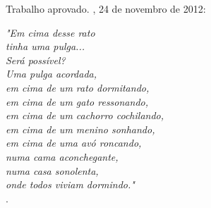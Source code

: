 
	\begin{folhadeaprovacao}

		\begin{center}
		  {\ABNTEXchapterfont\large\imprimirautor}
		  \vspace*{\fill}\vspace*{\fill}
		  \begin{center}
			\ABNTEXchapterfont\bfseries\Large\imprimirtitulo
		  \end{center}
		  \vspace*{\fill}
		  \hspace{.45\textwidth}
		  \begin{minipage}{.5\textwidth}
			  \imprimirpreambulo
		  \end{minipage}%
		  \vspace*{\fill}
		 \end{center}
			  
		 Trabalho aprovado. \imprimirlocal, 24 de novembro de 2012:
	  
			
		 \begin{center}
		  \vspace*{0.5cm}
		  {\large\imprimirlocal}
		  \par
		  {\large\imprimirdata}
		  \vspace*{1cm}
		\end{center}
		
	\end{folhadeaprovacao}

	\begin{epigrafe}
		\vspace*{\fill}
		\begin{flushright}
                \textit{"Em cima desse rato\\
                tinha uma pulga...\\
                Será possível?\\
                Uma pulga acordada,\\
                em cima de um rato dormitando,\\
                em cima de um gato ressonando,\\
                em cima de um cachorro cochilando,\\
                em cima de um menino sonhando,\\
                em cima de uma avó roncando,\\
                numa cama aconchegante,\\
                numa casa sonolenta,\\
                onde todos viviam dormindo."\\}
                \cite{casasonolenta}.
		\end{flushright}
	\end{epigrafe}